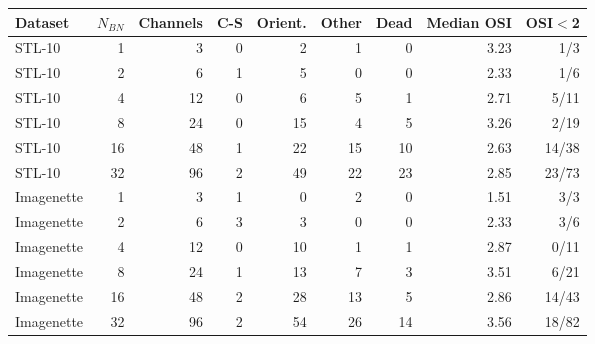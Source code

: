 \begin{tabular}{lrrrrrrrr}
\toprule
Dataset & $N_{BN}$ & Channels & C-S & Orient. & Other & Dead & Median OSI & OSI$<$2 \\
\midrule
STL-10 & 1 & 3 & 0 & 2 & 1 & 0 & 3.23 & 1/3 \\
STL-10 & 2 & 6 & 1 & 5 & 0 & 0 & 2.33 & 1/6 \\
STL-10 & 4 & 12 & 0 & 6 & 5 & 1 & 2.71 & 5/11 \\
STL-10 & 8 & 24 & 0 & 15 & 4 & 5 & 3.26 & 2/19 \\
STL-10 & 16 & 48 & 1 & 22 & 15 & 10 & 2.63 & 14/38 \\
STL-10 & 32 & 96 & 2 & 49 & 22 & 23 & 2.85 & 23/73 \\
Imagenette & 1 & 3 & 1 & 0 & 2 & 0 & 1.51 & 3/3 \\
Imagenette & 2 & 6 & 3 & 3 & 0 & 0 & 2.33 & 3/6 \\
Imagenette & 4 & 12 & 0 & 10 & 1 & 1 & 2.87 & 0/11 \\
Imagenette & 8 & 24 & 1 & 13 & 7 & 3 & 3.51 & 6/21 \\
Imagenette & 16 & 48 & 2 & 28 & 13 & 5 & 2.86 & 14/43 \\
Imagenette & 32 & 96 & 2 & 54 & 26 & 14 & 3.56 & 18/82 \\
\bottomrule
\end{tabular}
